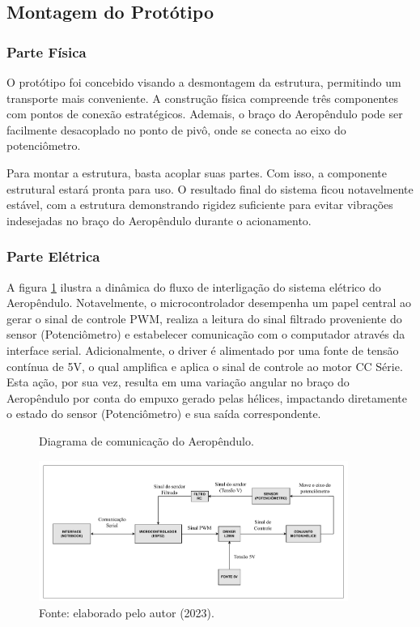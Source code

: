 \subsection{Montagem do Protótipo}

\subsubsection{Parte Física}

O protótipo foi concebido visando a desmontagem da estrutura, permitindo um transporte mais conveniente. A construção física compreende três componentes com pontos de conexão estratégicos. Ademais, o braço do Aeropêndulo pode ser facilmente desacoplado no ponto de pivô, onde se conecta ao eixo do potenciômetro.

Para montar a estrutura, basta acoplar suas partes. Com isso, a componente estrutural estará pronta para uso. O resultado final do sistema ficou notavelmente estável, com a estrutura demonstrando rigidez suficiente para evitar vibrações indesejadas no braço do Aeropêndulo durante o acionamento.

\subsubsection{Parte Elétrica}


A figura \ref{fig3:image_11} ilustra a dinâmica do fluxo de interligação do sistema elétrico do Aeropêndulo. Notavelmente, o microcontrolador desempenha um papel central ao gerar o sinal de controle PWM, realiza a leitura do sinal filtrado proveniente do sensor (Potenciômetro) e estabelecer comunicação com o computador através da interface serial. Adicionalmente, o driver é alimentado por uma fonte de tensão contínua de 5V, o qual amplifica e aplica o sinal de controle ao motor CC Série. Esta ação, por sua vez, resulta em uma variação angular no braço do Aeropêndulo por conta do empuxo gerado pelas hélices, impactando diretamente o estado do sensor (Potenciômetro) e sua saída correspondente.

\begin{figure}[!h]
	\centering
	\caption{Diagrama de comunicação do Aeropêndulo.}
	\includegraphics[width=0.9\textwidth, page=1]{Capitulos/3_hardware_softwares/3_figuras/diag_aerop.pdf}
	\caption*{Fonte: elaborado pelo autor (2023).}
	\label{fig3:image_11}
\end{figure}



